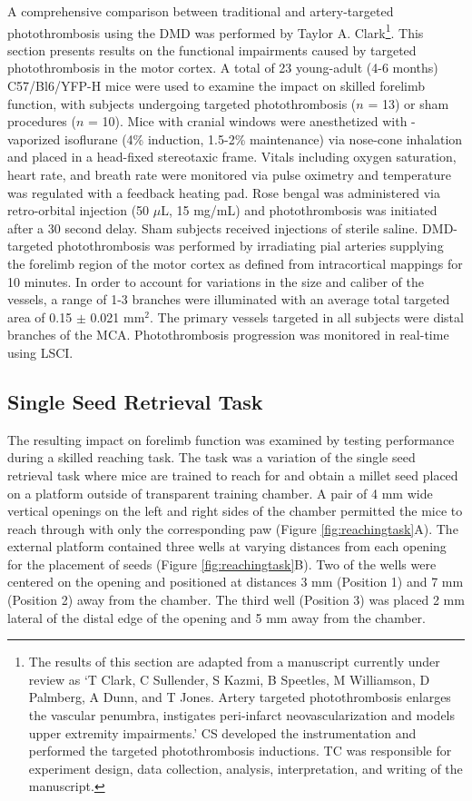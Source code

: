 A comprehensive comparison between traditional and artery-targeted photothrombosis using the DMD was performed by Taylor A. Clark\footnote{The results of this section are adapted from a manuscript currently under review as `T Clark, C Sullender, S Kazmi, B Speetles, M Williamson, D Palmberg, A Dunn, and T Jones. Artery targeted photothrombosis enlarges the vascular penumbra, instigates peri-infarct neovascularization and models upper extremity impairments.' CS developed the instrumentation and performed the targeted photothrombosis inductions. TC was responsible for experiment design, data collection, analysis, interpretation, and writing of the manuscript.}. This section presents results on the functional impairments caused by targeted photothrombosis in the motor cortex. A total of 23 young-adult (4-6 months) C57/Bl6/YFP-H mice were used to examine the impact on skilled forelimb function, with subjects undergoing targeted photothrombosis ($n$ = 13) or sham procedures ($n$ = 10). Mice with cranial windows were anesthetized with -vaporized isoflurane (4\% induction, 1.5-2\% maintenance) via nose-cone inhalation and placed in a head-fixed stereotaxic frame. Vitals including oxygen saturation, heart rate, and breath rate were monitored via pulse oximetry and temperature was regulated with a feedback heating pad. Rose bengal was administered via retro-orbital injection (50 $\mu$L, 15 mg/mL) and photothrombosis was initiated after a 30 second delay. Sham subjects received injections of sterile saline. DMD-targeted photothrombosis was performed by irradiating pial arteries supplying the forelimb region of the motor cortex as defined from intracortical mappings \cite{Tennant:2011cx} for 10 minutes. In order to account for variations in the size and caliber of the vessels, a range of 1-3 branches were illuminated with an average total targeted area of 0.15 $\pm$ 0.021 mm$^2$. The primary vessels targeted in all subjects were distal branches of the MCA. Photothrombosis progression was monitored in real-time using LSCI.

\subsection{Single Seed Retrieval Task}

The resulting impact on forelimb function was examined by testing performance during a skilled reaching task. The task was a variation of the single seed retrieval task \cite{Chen:2014hy} where mice are trained to reach for and obtain a millet seed placed on a platform outside of transparent training chamber. A pair of 4 mm wide vertical openings on the left and right sides of the chamber permitted the mice to reach through with only the corresponding paw (Figure \ref{fig:reachingtask}A). The external platform contained three wells at varying distances from each opening for the placement of seeds (Figure \ref{fig:reachingtask}B). Two of the wells were centered on the opening and positioned at distances 3 mm (Position 1) and 7 mm (Position 2) away from the chamber. The third well (Position 3) was placed 2 mm lateral of the distal edge of the opening and 5 mm away from the chamber.

